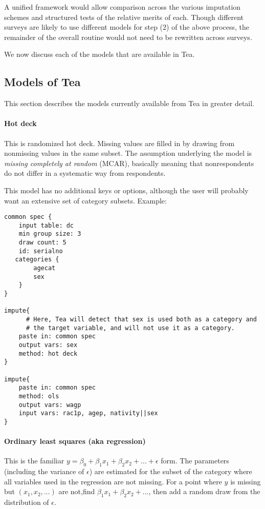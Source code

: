 \documentclass{article}
\begin{document}
A unified framework would allow comparison across the various imputation
schemes and structured tests of the relative merits of each. Though different surveys
are likely to use different models for step (2) of the above process, the
remainder of the overall routine would not need to be rewritten across surveys.

We now discuss each of the models that are available in Tea.

\subsection{Models of Tea} This section describes the models currently available from
Tea in greater detail.

\paragraph{Hot deck} This is randomized hot deck. Missing values are filled in by
drawing from nonmissing values in the same subset. The assumption underlying the model
is {\em missing completely at random} (MCAR), basically meaning that nonrespondents
do not differ in a systematic way from respondents.

This model has no additional keys or options, although the user will probably want an
extensive set of category subsets. Example:

\begin{lstlisting}
common spec {
    input table: dc
    min group size: 3
    draw count: 5
    id: serialno
   categories {
        agecat
        sex
    }
}

impute{
      # Here, Tea will detect that sex is used both as a category and 
      # the target variable, and will not use it as a category.
    paste in: common spec
    output vars: sex
    method: hot deck
}

impute{
    paste in: common spec
    method: ols
    output vars: wagp
    input vars: rac1p, agep, nativity||sex
}
\end{lstlisting}

\paragraph{Ordinary least squares (aka regression)}  This is the familiar $y = \beta_0
+ \beta_1 x_1  + \beta_2 x_2 + \dots +\epsilon$ form. The parameters (including the
variance of $\epsilon$) are estimated for the subset of the category where all variables
used in the regression are not missing. For a point where $y$ is missing but $(x_1, x_2, \dots)$ are not,find $\beta_1 x_1  + \beta_2 x_2 + \dots$, then add a random draw from the distribution of $\epsilon$.
\end{document}
